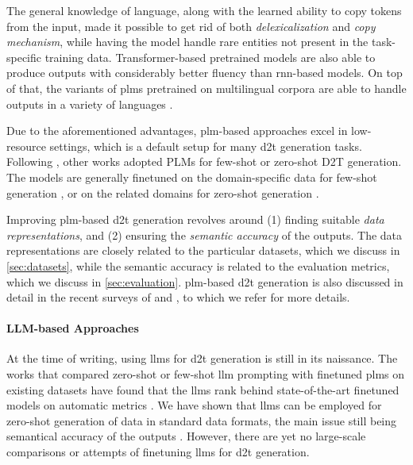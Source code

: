 {The general knowledge of language, along with the learned ability to copy tokens from the input, made it possible to get rid of both \emph{delexicalization} and \emph{copy mechanism}, while having the model handle rare entities not present in the task-specific training data. Transformer-based pretrained models are also able to produce outputs with considerably better fluency than \ac{rnn}-based models. On top of that, the variants of \acp{plm} pretrained on multilingual corpora are able to handle outputs in a variety of languages \cite{liuMultilingualDenoisingPretraining2020,xueMT5MassivelyMultilingual2021}.

Due to the aforementioned advantages, \ac{plm}-based approaches excel in low-resource settings, which is a default setup for many \ac{d2t} generation tasks. Following \citet{chenFewShotNLGPreTrained2019}, other works adopted PLMs for few-shot or zero-shot D2T generation. The models are generally finetuned on the domain-specific data for few-shot generation \cite{changNeuralDatatoTextGeneration2021,suFewShotTabletoTextGeneration2021}, or on the related domains for zero-shot generation \cite{kasner2022neural,kasnerMindLabelsDescribing2022}.

Improving \ac{plm}-based \ac{d2t} generation revolves around (1) finding suitable \emph{data representations}, and (2) ensuring the \emph{semantic accuracy} of the outputs. The data representations are closely related to the particular datasets, which we discuss in \autoref{sec:datasets}, while the semantic accuracy is related to the evaluation metrics, which we discuss in \autoref{sec:evaluation}. \ac{plm}-based \ac{d2t} generation is also discussed in detail in the recent surveys of \citet{sharmaInnovationsNeuralDatatotext2022} and \citet{lin2023survey}, to which we refer for more details.

\paragraph{LLM-based Approaches} At the time of writing, using \acp{llm} for \ac{d2t} generation is still in its naissance. The works that compared zero-shot or few-shot \ac{llm} prompting with finetuned \acp{plm} on existing datasets have found that the \acp{llm} rank behind state-of-the-art finetuned models on automatic metrics \cite{axelssonUsingLargeLanguage2023,yuanEvaluatingGenerativeModels2023}. We have shown that \acp{llm} can be employed for zero-shot generation of data in standard data formats, the main issue still being semantical accuracy of the outputs \cite{kasnerReferenceBasedMetricsAnalyzing2024}. However, there are yet no large-scale comparisons or attempts of finetuning \acp{llm} for \ac{d2t} generation.

}
